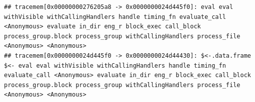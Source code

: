 \documentclass[
  12pt,
  norsk,
]{article}
\newenvironment{Shaded}{\begin{snugshade}}{\end{snugshade}}
\newcommand{\ConstantTok}[1]{\textcolor[rgb]{0.00,0.00,0.00}{#1}}
\newcommand{\DecValTok}[1]{\textcolor[rgb]{0.00,0.00,0.81}{#1}}
\newcommand{\FloatTok}[1]{\textcolor[rgb]{0.00,0.00,0.81}{#1}}
\newcommand{\FunctionTok}[1]{\textcolor[rgb]{0.00,0.00,0.00}{#1}}
\newcommand{\NormalTok}[1]{#1}
\newcommand{\OtherTok}[1]{\textcolor[rgb]{0.56,0.35,0.01}{#1}}
\newcommand{\SpecialCharTok}[1]{\textcolor[rgb]{0.00,0.00,0.00}{#1}}
\newcommand{\StringTok}[1]{\textcolor[rgb]{0.31,0.60,0.02}{#1}}
\begin{document}
\begin{Shaded}
\end{Shaded}

\begin{verbatim}
## tracemem[0x00000000276205a8 -> 0x0000000024d445f0]: eval eval withVisible withCallingHandlers handle timing_fn evaluate_call <Anonymous> evaluate in_dir eng_r block_exec call_block process_group.block process_group withCallingHandlers process_file <Anonymous> <Anonymous> 
## tracemem[0x0000000024d445f0 -> 0x0000000024d44430]: $<-.data.frame $<- eval eval withVisible withCallingHandlers handle timing_fn evaluate_call <Anonymous> evaluate in_dir eng_r block_exec call_block process_group.block process_group withCallingHandlers process_file <Anonymous> <Anonymous>
\end{verbatim}

\begin{Shaded}
\end{Shaded}

\begin{Shaded}
\end{Shaded}
\end{document}
